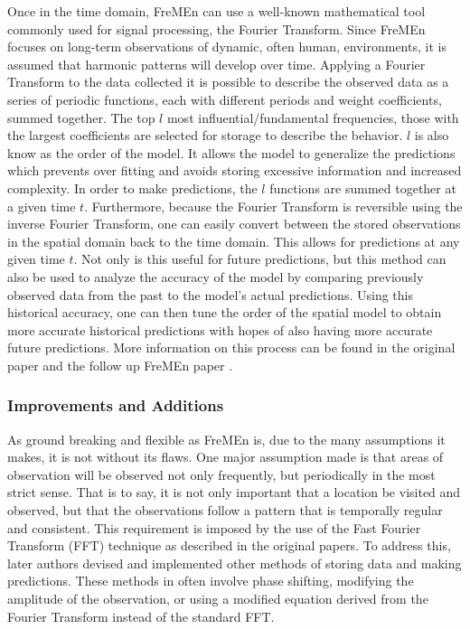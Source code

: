  Once in the time domain, FreMEn can use a well-known mathematical tool commonly used for
  signal processing, the Fourier Transform. Since FreMEn focuses on long-term
  observations of dynamic, often human, environments, it is assumed that harmonic
  patterns will develop over time. Applying a Fourier Transform to the data
  collected it is possible to describe the observed data as a series of periodic
  functions, each with different periods and weight coefficients, summed together.
  The top $l$ most influential/fundamental frequencies, those with the largest
  coefficients are selected for storage to describe the behavior. $l$ is also
  know as the order of the model. It allows the model to generalize
  the predictions which prevents over fitting and avoids storing excessive information and
  increased complexity. In order to make predictions, the $l$ functions are summed
  together at a given time $t$.
  Furthermore, because the Fourier Transform is reversible
  using the inverse Fourier Transform, one can easily convert between the stored
  observations in the spatial domain back to the time domain. This allows for
  predictions at any given time $t$. Not only is this useful for future
  predictions, but this method can also be used to analyze the accuracy of the
  model by comparing previously observed data from the past to the model's actual
  predictions. Using this historical accuracy, one can then tune the order of the
  spatial model to obtain more accurate historical predictions with hopes of
  also having more accurate future predictions. More information on this process
  can be found in the original paper \cite{Fentanes2014} and the follow up FreMEn
  paper \cite{Krajnik2015}. \\

  \subsubsection{ Improvements and Additions }

  As ground breaking and flexible as FreMEn is, due to the many assumptions
  it makes, it is not without its flaws. One major assumption made is that areas of
  observation will be observed not only frequently, but periodically in the most
  strict sense. That is to say, it is not only important that a location be
  visited and observed, but that the observations follow a pattern that is
  temporally regular and consistent. This requirement is imposed by the use of the Fast Fourier Transform (FFT)
  technique as described in the original papers. To address this, later authors devised and
  implemented other methods of storing data and making predictions. These methods in \cite{Santos2016} often
  involve phase shifting, modifying the amplitude of the observation, or
  using a modified equation derived from the Fourier Transform instead of the
  standard FFT. \\

